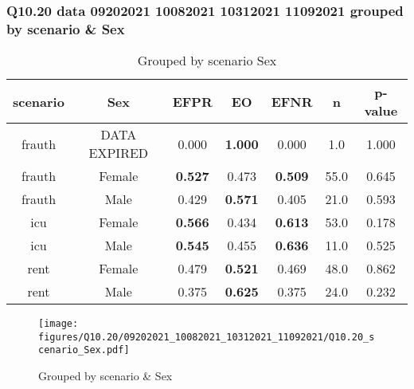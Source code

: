 \subsubsection{Q10.20 data 09202021 10082021 10312021 11092021 grouped by scenario \& Sex}

\begin{comment}
                            EFPR        EO      EFNR     n    pvalue
(frauth, DATA EXPIRED)  0.000000  1.000000  0.000000   1.0  1.000000
(frauth, Female)        0.527273  0.472727  0.509091  55.0  0.644689
(frauth, Male)          0.428571  0.571429  0.404762  21.0  0.592980
(icu, Female)           0.566038  0.433962  0.613208  53.0  0.178289
(icu, Male)             0.545455  0.454545  0.636364  11.0  0.525394
(rent, Female)          0.479167  0.520833  0.468750  48.0  0.862032
(rent, Male)            0.375000  0.625000  0.375000  24.0  0.232165
\end{comment}

\begin{table}[h]
    \centering
    \begin{tabular}{|c|c|c|c|c|c|c|}
        \hline
        scenario & Sex & EFPR & EO & EFNR & n & p-value\\
        \hline
        frauth & DATA EXPIRED & 0.000 & \textbf{1.000} & 0.000 & 1.0 & 1.000\\
		frauth & Female & \textbf{0.527} & 0.473 & \textbf{0.509} & 55.0 & 0.645\\
		frauth & Male & 0.429 & \textbf{0.571} & 0.405 & 21.0 & 0.593\\
		icu & Female & \textbf{0.566} & 0.434 & \textbf{0.613} & 53.0 & 0.178\\
		icu & Male & \textbf{0.545} & 0.455 & \textbf{0.636} & 11.0 & 0.525\\
		rent & Female & 0.479 & \textbf{0.521} & 0.469 & 48.0 & 0.862\\
		rent & Male & 0.375 & \textbf{0.625} & 0.375 & 24.0 & 0.232\\
		
        \hline
    \end{tabular}
    \caption{Grouped by scenario Sex}
    \label{tab:my_label}
\end{table}
\begin{figure}[h]
    \centering
    \texttt{[image: figures/Q10.20/09202021\_10082021\_10312021\_11092021/Q10.20\_scenario\_Sex.pdf]}
    \caption{Grouped by scenario \& Sex}
    \label{fig:my_label}
\end{figure}
